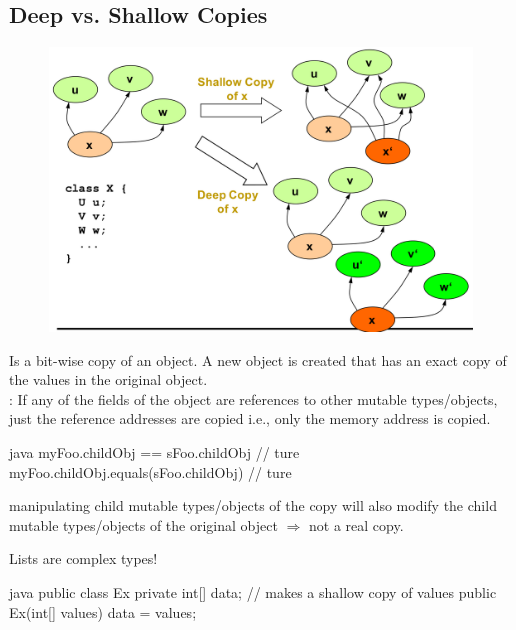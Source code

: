 \subsection{Deep vs. Shallow Copies}
\begin{figure}[H]
  \centering
  \vspace{-1em}
  \includegraphics[width=1.0\columnwidth]{figures/shallowVsDeppCopy.png}
\end{figure}
\begin{defnbox}\nospacing
  \begin{defn}\label{defn:shallowCopy}
    Is a bit-wise copy of an object. A new object is created that has an exact
    copy of the values in the original object.\\
    : If any of the fields of the object are references to other
    mutable types/objects, just the reference addresses are copied i.e., only
    the memory address is copied.\\
    \begin{mintlinebox}{java}
      myFoo.childObj == sFoo.childObj // ture
      myFoo.childObj.equals(sFoo.childObj) // ture
    \end{mintlinebox}
     manipulating child mutable types/objects of the copy will also modify the child mutable types/objects
    of the original object $\Rightarrow$ not a real copy.
  \end{defn}
\end{defnbox}
\begin{notebox}[Attention]\nospacing
  Lists are complex types!
\end{notebox}
\begin{codeboxNl}{java}
  public class Ex { 
    private int[] data; 
    // makes a shallow copy of values 
    public Ex(int[] values) { 
        data = values; 
    } 
} 
\end{codeboxNl}

